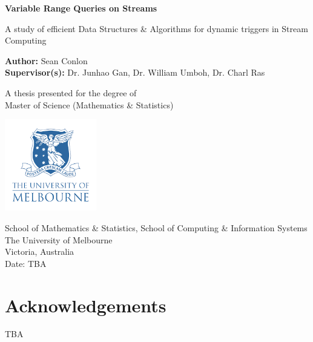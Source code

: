 \documentclass{article}
\begin{document}
\begin{titlepage}
   \begin{center}
       \vspace*{1cm}

       \textbf{Variable Range Queries on Streams}

       \vspace{0.5cm}
        A study of efficient Data Structures \& Algorithms for dynamic triggers in Stream Computing
            
       \vspace{1.5cm}

       \textbf{Author:} Sean Conlon \\
       \textbf{Supervisor(s):} Dr. Junhao Gan, Dr. William Umboh, Dr. Charl Ras

       \vfill
            
       A thesis presented for the degree of\\
       Master of Science (Mathematics \& Statistics) 
            
       \vspace{0.8cm}
     
       \includegraphics[width=0.3\textwidth]{images/uomlogo.png}
            
       School of Mathematics \& Statistics, School of Computing \& Information Systems\\
       The University of Melbourne\\
       Victoria, Australia\\
       Date: TBA
            
   \end{center}
\end{titlepage}



\newpage
\section*{Acknowledgements}
TBA



\newpage
\tableofcontents
\thispagestyle{empty}
\clearpage
\setcounter{page}{1}




\newpage
 



\newpage




\newpage





\newpage

\end{document}

